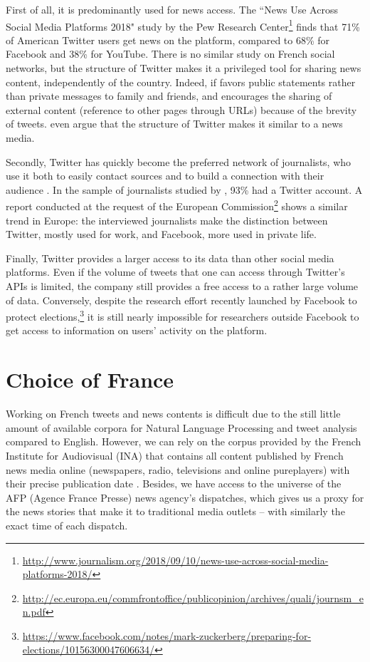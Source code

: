 	
	First of all, it is predominantly used for news access. The ``News Use Across Social Media Platforms 2018" study by the Pew Research Center\footnote{\url{http://www.journalism.org/2018/09/10/news-use-across-social-media-platforms-2018/}} finds that 71\% of American Twitter users get news on the platform, compared to 68\% for Facebook and 38\% for YouTube. There is no similar study on French social networks, but the structure of Twitter makes it a privileged tool for sharing news content, independently of the country. Indeed, if favors public statements rather than private messages to family and friends, and encourages the sharing of external content (reference to other pages through URLs) because of the brevity of tweets. \citet{kwak_twitter_2010} even argue that the structure of Twitter makes it similar to a news media.
	
	
	Secondly, Twitter has quickly become the preferred network of journalists, who use it both to easily contact sources and to build a connection with their audience \citep{swasy_little_2016}. In the sample of journalists studied by \citet{mcgregor_twitter_2018}, 93\% had a Twitter account. A report conducted at the request of the European Commission\footnote{\url{http://ec.europa.eu/commfrontoffice/publicopinion/archives/quali/journsm_en.pdf}} shows a similar trend in Europe: the interviewed journalists make the distinction between Twitter, mostly used for work, and Facebook, more used in private life.
	
	
	Finally, Twitter provides a larger access to its data than other social media platforms. Even if the volume of tweets that one can access through Twitter's APIs is limited, the company still provides a free access to a rather large volume of data. Conversely, despite the research effort recently launched by Facebook to protect elections,\footnote{\url{https://www.facebook.com/notes/mark-zuckerberg/preparing-for-elections/10156300047606634/}} it is still nearly
impossible for researchers outside Facebook to get access to information on users' activity on the platform.

\section{Choice of France}
Working on French tweets and news contents is difficult due to the still little amount of available corpora for Natural Language Processing and tweet analysis compared to English. However, we can rely on the corpus provided by the French Institute for Audiovisual (INA) that contains all content published by French news media online (newspapers, radio, televisions and online pureplayers) with their precise publication date \citep{CageHerveViaud2015}. 
Besides, we have access to the universe of the AFP (Agence France Presse) news agency’s dispatches,
which gives us a proxy for the news stories that make it to traditional media outlets – with similarly the exact time of each dispatch. 


